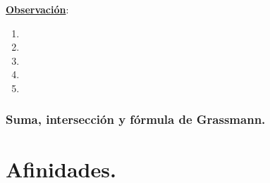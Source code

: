 \documentclass[11pt]{article}
\newcommand{\obs}{\underline{\textbf{Observación}}: }
\begin{document}
\obs \begin{enumerate}
	\item
	\item
	\item
	\item
	\item
\end{enumerate}
\subsubsection{Suma, intersección y fórmula de Grassmann.}
\newpage





\section{Afinidades.}
\end{document}
